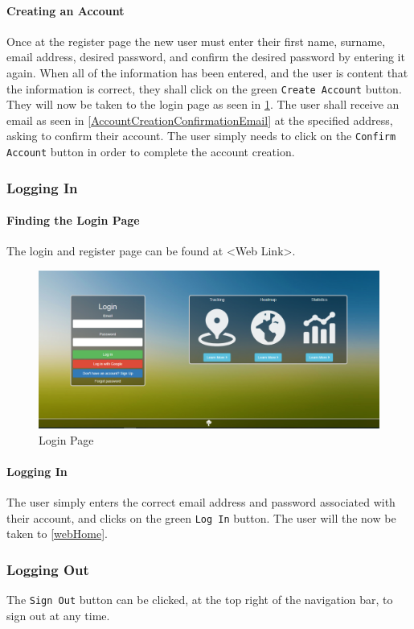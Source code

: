 \documentclass[11pt]{article}
\begin{document}
\paragraph{Creating an Account}Once at the register page the new user must enter their first name, surname, email address, desired password, and confirm the desired password by entering it again. When all of the information has been entered, and the user is content that the information is correct, they shall click on the green \texttt{Create Account} button. They will now be taken to the login page as seen in \ref{LoginPage}. The user shall receive an email as seen in \ref{AccountCreationConfirmationEmail} at the specified address, asking to confirm their account. The user simply needs to click on the \texttt{Confirm Account} button in order to complete the account creation.

\subsubsection{Logging In}
\paragraph{Finding the Login Page}The login and register page can be found at <Web Link>.

\begin{figure}
 \centering
 \includegraphics[width=12cm, keepaspectratio]{Images/webLogin.png}
 \caption{Login Page}
 \label{LoginPage}
\end{figure}

\paragraph{Logging In}The user simply enters the correct email address and password associated with their account, and clicks on the green \texttt{Log In} button. The user will the now be taken to \ref{webHome}.

\subsubsection{Logging Out}
\label{webLoggingOut}
The \texttt{Sign Out} button can be clicked, at the top right of the navigation bar, to sign out at any time.
\end{document}

